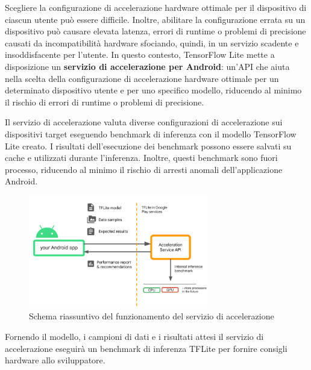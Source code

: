 Scegliere la configurazione di accelerazione hardware ottimale per il dispositivo di ciascun utente può essere difficile. Inoltre, abilitare la
configurazione errata su un dispositivo può causare elevata latenza, errori di runtime o problemi di precisione causati da incompatibilità hardware
sfociando, quindi, in un servizio scadente e insoddisfacente per l’utente. In questo contesto, TensorFlow Lite mette a disposizione un \textbf{servizio di
accelerazione per Android}: un'API che aiuta nella scelta della configurazione di accelerazione hardware ottimale per un determinato dispositivo utente e
per uno specifico modello, riducendo al minimo il rischio di errori di runtime o problemi di precisione.

Il servizio di accelerazione valuta diverse configurazioni di accelerazione sui dispositivi target eseguendo benchmark di inferenza con il modello
TensorFlow Lite creato. I risultati dell’esecuzione dei benchmark possono essere salvati su cache e utilizzati durante l’inferenza. Inoltre, questi
benchmark sono fuori processo, riducendo al minimo il rischio di arresti anomali dell’applicazione Android.

\begin{figure}[ht]
    \centering
    \includegraphics[width=0.7\textwidth]{Immagini/accelerazione.png}
    \caption{Schema riassuntivo del funzionamento del servizio di accelerazione}
    \label{fig:accelerazione}
\end{figure}

Fornendo il  modello, i campioni di dati e i risultati attesi il servizio di accelerazione eseguirà un benchmark di inferenza TFLite per fornire
consigli hardware allo sviluppatore.

